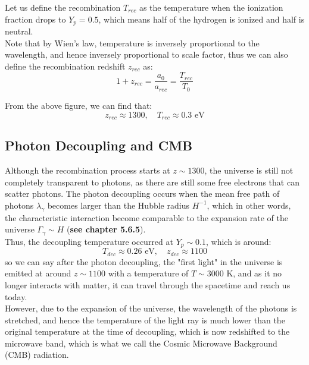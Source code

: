 \bigskip \noindent
\begin{theory}
    Let us define the recombination $T_{rec}$ as the temperature when the ionization fraction drops to $Y_p = 0.5$, which means half of the hydrogen is ionized and half is neutral. \\
    
    Note that by Wien's law, temperature is inversely proportional to the wavelength, and hence inversely proportional to scale factor, thus we can also define the recombination redshift $z_{rec}$ as:
    \[
        1 + z_{rec} = \frac{a_0}{a_{rec}} = \frac{T_{rec}}{T_0}
    \]

    From the above figure, we can find that:
    \[
        z_{rec} \approx 1300, \quad T_{rec} \approx 0.3 \text{ eV}
    \]
\end{theory}


\bigskip \noindent \bigskip \noindent \bigskip \noindent
\subsection{Photon Decoupling and CMB}
\begin{intuition}
    Although the recombination process starts at $z \sim 1300$, the universe is still not completely transparent to photons, as there are still some free electrons that can scatter photons. The photon decoupling occurs when the mean free path of photons $\lambda_\gamma$ becomes larger than the Hubble radius $H^{-1}$, which in other words, the characteristic interaction become comparable to the expansion rate of the universe $\Gamma_\gamma \sim H$ (\textbf{see chapter 5.6.5}). \\

    Thus, the decoupling temperature occurred at $Y_p \sim 0.1$, which is around:
    \[
        T_{dec} \approx 0.26 \text{ eV}, \quad z_{dec} \approx 1100
    \]
    so we can say after the photon decoupling, the "first light" in the universe is emitted at around $z \sim 1100$ with a temperature of $T \sim 3000$ K, and as it no longer interacts with matter, it can travel through the spacetime and reach us today. \\
    
    However, due to the expansion of the universe, the wavelength of the photons is stretched, and hence the temperature of the light ray is much lower than the original temperature at the time of decoupling, which is now redshifted to the microwave band, which is what we call the Cosmic Microwave Background (CMB) radiation. \\
\end{intuition}

